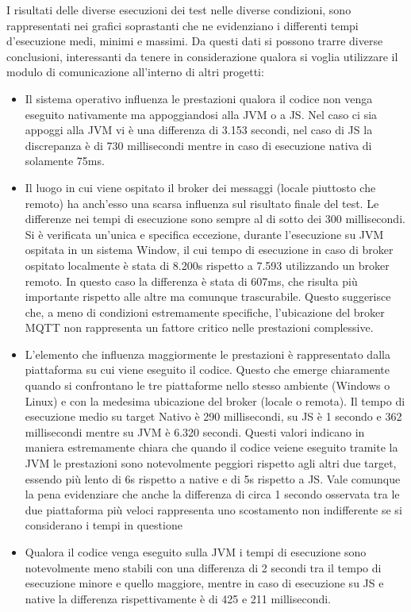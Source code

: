 \documentclass[12pt,a4paper,openright,twoside]{book}
\begin{document}
I risultati delle diverse esecuzioni dei test nelle diverse condizioni, sono rappresentati nei grafici soprastanti che ne evidenziano i differenti tempi d'esecuzione 
medi, minimi e massimi. Da questi dati si possono trarre diverse conclusioni, interessanti da tenere in considerazione qualora si voglia utilizzare il modulo di comunicazione 
all'interno di altri progetti:

\begin{itemize}
    \item Il sistema operativo influenza le prestazioni qualora il codice non venga eseguito nativamente ma appoggiandosi alla \ac{JVM} o a \ac{JS}. 
    Nel caso ci sia appoggi alla \ac{JVM} vi è una differenza di 3.153 secondi, nel caso di \ac{JS} la discrepanza è di 730 millisecondi 
    mentre in caso di esecuzione nativa di solamente 75ms.

    \pagebreak

    \item Il luogo in cui viene ospitato il broker dei messaggi (locale piuttosto che remoto) ha anch’esso una scarsa influenza sul risultato finale del test. 
    Le differenze nei tempi di esecuzione sono sempre al di sotto dei 300 millisecondi. Si è verificata un'unica e specifica eccezione, durante l'esecuzione su \ac{JVM}
    ospitata in un sistema Window, il cui tempo di esecuzione in caso di broker ospitato localmente è stata di 8.200s rispetto a 7.593 utilizzando un broker remoto.
    In questo caso la differenza è stata di 607ms, che risulta più importante rispetto alle altre ma comunque trascurabile. 
    Questo suggerisce che, a meno di condizioni estremamente specifiche, l'ubicazione del broker \ac{MQTT} non rappresenta un fattore critico nelle prestazioni complessive.

    \item L’elemento che influenza maggiormente le prestazioni è rappresentato dalla piattaforma su cui viene eseguito il codice. Questo che emerge chiaramente quando si confrontano 
    le tre piattaforme nello stesso ambiente (Windows o Linux) e con la medesima ubicazione del broker (locale o remota). 
    Il tempo di esecuzione medio su target Nativo è 290 millisecondi, su \ac{JS} è 1 secondo e 362 millisecondi mentre su \ac{JVM} è 6.320 secondi.
    Questi valori indicano in maniera estremamente chiara che quando il codice veiene eseguito tramite la \ac{JVM} le prestazioni sono notevolmente 
    peggiori rispetto agli altri due target, essendo più lento di 6s rispetto a native e di 5s rispetto a \ac{JS}.
    Vale comunque la pena evidenziare che anche la differenza di circa 1 secondo osservata tra le due piattaforma più veloci 
    rappresenta uno scostamento non indifferente se si considerano i tempi in questione

    \item Qualora il codice venga eseguito sulla \ac{JVM} i tempi di esecuzione sono notevolmente meno stabili con una differenza di 2 secondi 
    tra il tempo di esecuzione minore e quello maggiore, mentre in caso di esecuzione su \ac{JS} e native la differenza rispettivamente è di 425 e 211 millisecondi.
\end{itemize}
\end{document}
